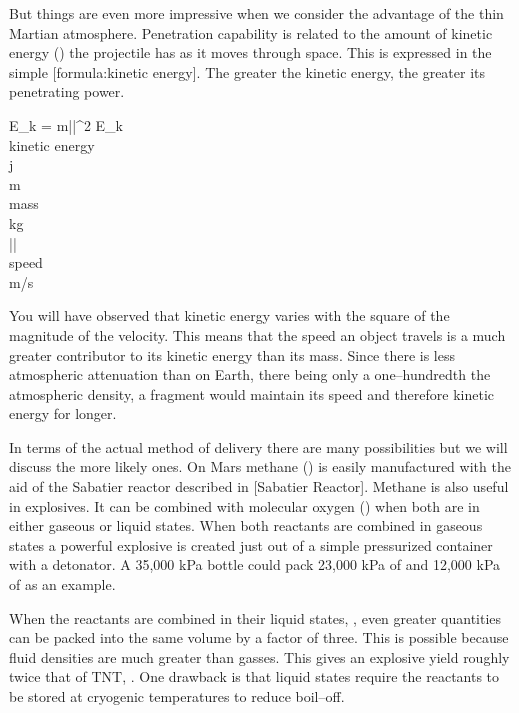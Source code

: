 But things are even more impressive when we consider the advantage of the thin Martian atmosphere. Penetration capability is related to the amount of kinetic energy () the projectile has as it moves through space. This is expressed in the simple [formula:kinetic energy]. The greater the kinetic energy, the greater its penetrating power.

\vfill
{}
\startformula
E_k =  m||^{2}
\stopformula
\startlegend
\leg E_k \\ kinetic energy \\ j \\
\leg m \\ mass \\ kg \\
\leg || \\ speed \\ m/s \\
\stoplegend
\vfill

You will have observed that kinetic energy varies with the square of the magnitude of the velocity. This means that the speed an object travels is a much greater contributor to its kinetic energy than its mass. Since there is less atmospheric attenuation than on Earth, there being only a one--hundredth the atmospheric density, a fragment would maintain its speed and therefore kinetic energy for longer.

In terms of the actual method of delivery there are many possibilities but we will discuss the more likely ones. On Mars methane () is easily manufactured with the aid of the Sabatier reactor described in [Sabatier Reactor]. Methane is also useful in explosives. It can be combined with molecular oxygen () when both are in either gaseous or liquid states. When both reactants are combined in gaseous states a powerful explosive is created just out of a simple pressurized container with a detonator. A 35,000 kPa bottle could pack 23,000 kPa of  and 12,000 kPa of  as an example.

When the reactants are combined in their liquid states, , even greater quantities can be packed into the same volume by a factor of three. This is possible because fluid densities are much greater than gasses. This gives an explosive yield roughly twice that of TNT, . One drawback is that liquid states require the reactants to be stored at cryogenic temperatures to reduce boil--off.

